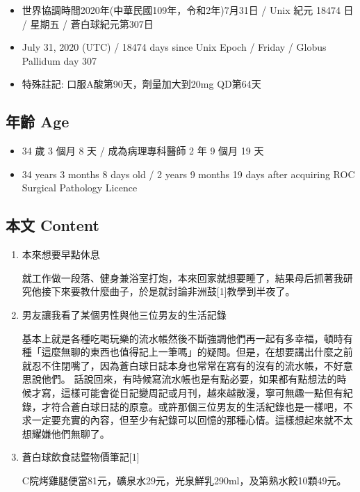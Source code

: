 \documentclass[
]{article}
\providecommand{\tightlist}{%
  \setlength{\itemsep}{0pt}\setlength{\parskip}{0pt}}
\begin{document}
\begin{itemize}
\tightlist
\item
  世界協調時間2020年(中華民國109年，令和2年)7月31日 / Unix 紀元 18474 日
  / 星期五 / 蒼白球紀元第307日
\item
  July 31, 2020 (UTC) / 18474 days since Unix Epoch / Friday / Globus
  Pallidum day 307
\item
  特殊註記: 口服A酸第90天，劑量加大到20mg QD第64天
\end{itemize}

\hypertarget{ux5e74ux9f61-age-30}{%
\subsection{年齡 Age}\label{ux5e74ux9f61-age-30}}

\begin{itemize}
\tightlist
\item
  34 歲 3 個月 8 天 / 成為病理專科醫師 2 年 9 個月 19 天
\item
  34 years 3 months 8 days old / 2 years 9 months 19 days after
  acquiring ROC Surgical Pathology Licence
\end{itemize}

\hypertarget{ux672cux6587-content-30}{%
\subsection{本文 Content}\label{ux672cux6587-content-30}}

\begin{enumerate}
\def\labelenumi{\arabic{enumi}.}
\item
  本來想要早點休息

  就工作做一段落、健身兼浴室打炮，本來回家就想要睡了，結果母后抓著我研究他接下來要教什麼曲子，於是就討論非洲鼓{[}1{]}教學到半夜了。
\item
  男友讓我看了某個男性與他三位男友的生活記錄

  基本上就是各種吃喝玩樂的流水帳然後不斷強調他們再一起有多幸福，頓時有種「這麼無聊的東西也值得記上一筆嗎」的疑問。但是，在想要講出什麼之前就忍不住閉嘴了，因為蒼白球日誌本身也常常在寫有的沒有的流水帳，不好意思說他們。
  話說回來，有時候寫流水帳也是有點必要，如果都有點想法的時候才寫，這樣可能會從日記變周記或月刊，越來越散漫，寧可無趣一點但有紀錄，才符合蒼白球日誌的原意。或許那個三位男友的生活紀錄也是一樣吧，不求一定要充實的內容，但至少有紀錄可以回憶的那種心情。這樣想起來就不太想耀嫌他們無聊了。
\item
  蒼白球飲食誌暨物價筆記{[}1{]}

  C院烤雞腿便當81元，礦泉水29元，光泉鮮乳290ml，及第熟水餃10顆49元。
\end{enumerate}
\end{document}
